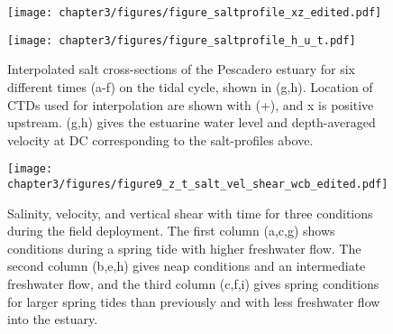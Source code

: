 \begin{figure}
\texttt{[image: chapter3/figures/figure\_saltprofile\_xz\_edited.pdf]}

\texttt{[image: chapter3/figures/figure\_saltprofile\_h\_u\_t.pdf]}

\protect\caption{Interpolated salt cross-sections of the Pescadero estuary for six
different times (a-f) on the tidal cycle, shown in (g,h). Location
of CTDs used for interpolation are shown with (+), and x is positive
upstream. (g,h) gives the estuarine water level and depth-averaged
velocity at DC corresponding to the salt-profiles above. \label{f10_Sxz}}
\end{figure}


\begin{figure}
\texttt{[image: chapter3/figures/figure9\_z\_t\_salt\_vel\_shear\_wcb\_edited.pdf]}
\protect\caption{Salinity, velocity, and vertical shear with time for three conditions
during the field deployment. The first column (a,c,g) shows conditions
during a spring tide with higher freshwater flow. The second column
(b,e,h) gives neap conditions and an intermediate freshwater flow,
and the third column (c,f,i) gives spring conditions for larger spring
tides than previously and with less freshwater flow into the estuary.
\label{f11_SUtz}}
\end{figure}


